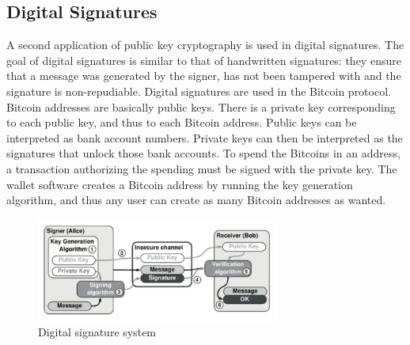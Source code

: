 \documentclass{article}
\begin{document}
\subsection*{Digital Signatures}
A second application of public key cryptography is used in digital signatures. The goal of digital signatures is similar to that of handwritten signatures: they ensure that a message was generated by the signer, has not been tampered with and the signature is non-repudiable.\newline
Digital signatures are used in the Bitcoin protocol. Bitcoin addresses are basically public keys. There is a private key corresponding to each public key, and thus to each Bitcoin address. Public keys can be interpreted as bank account numbers. Private keys can then be interpreted as the signatures that unlock those bank accounts. To spend the Bitcoins in an address, a transaction authorizing the spending must be signed with the private key. The wallet software creates a Bitcoin address by running the key generation algorithm, and thus any user can create as many Bitcoin addresses as wanted.

\begin{figure}[H]
    \centering
    \includegraphics[width=8cm]{images/10.png}
    \caption{Digital signature system}
\end{figure}
\end{document}
